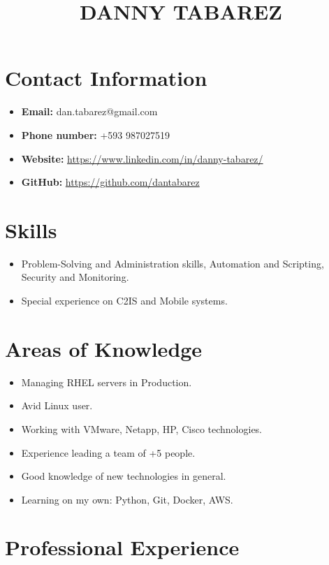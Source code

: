 \documentclass{article}
\title{DANNY TABAREZ}
\author{}
\date{}
\begin{document}
\maketitle

\section*{Contact Information}

\begin{itemize}
  \item \textbf{Email:} dan.tabarez@gmail.com
  \item \textbf{Phone number:} +593 987027519
  \item \textbf{Website:} \url{https://www.linkedin.com/in/danny-tabarez/}
  \item \textbf{GitHub:} \url{https://github.com/dantabarez}
\end{itemize}

\section*{Skills}

\begin{itemize}
  \item Problem-Solving and Administration skills, Automation and Scripting, Security and Monitoring.
  \item Special experience on C2IS and Mobile systems.
\end{itemize}

\section*{Areas of Knowledge}

\begin{itemize}
  \item Managing RHEL servers in Production.
  \item Avid Linux user.
  \item Working with VMware, Netapp, HP, Cisco technologies.
  \item Experience leading a team of +5 people.
  \item Good knowledge of new technologies in general.
  \item Learning on my own: Python, Git, Docker, AWS.
\end{itemize}

\section*{Professional Experience}
\end{document}

